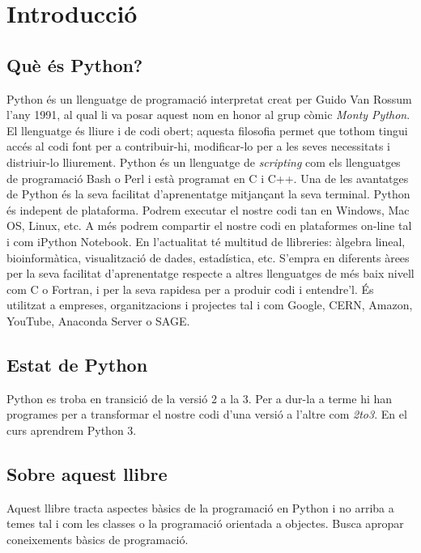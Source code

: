 


\chapter{Introducció}
\setcounter{page}{1}
\pagestyle{plain}   %


\section{Què és Python?}

Python és un llenguatge de programació interpretat creat per Guido Van Rossum l'any 1991, al qual li va posar aquest nom en honor al grup còmic \emph{Monty Python}. El llenguatge és lliure i de codi obert; aquesta filosofia permet que tothom tingui accés al codi font per a contribuir-hi, modificar-lo per a les seves necessitats i distriuir-lo lliurement. Python és un llenguatge de \emph{scripting} com els llenguatges de programació Bash o Perl i està programat en C i C++. Una de les avantatges de Python és la seva facilitat d'aprenentatge mitjançant la seva terminal. Python és indepent de plataforma. Podrem executar el nostre codi tan en Windows, Mac OS, Linux, etc. A més podrem compartir el nostre codi en plataformes on-line tal i com iPython Notebook. En l'actualitat té multitud de llibreries: àlgebra lineal, bioinformàtica, visualització de dades, estadística, etc. S'empra en diferents àrees per la seva facilitat d'aprenentatge respecte a altres llenguatges de més baix nivell com C o Fortran, i per la seva rapidesa per a produir codi i entendre'l. És utilitzat a empreses, organitzacions i projectes tal i com Google, CERN, Amazon, YouTube, Anaconda Server o SAGE. 
  

\section{Estat de Python}

Python es troba en transició de la versió 2 a la 3. Per a dur-la a terme hi han programes per a transformar el nostre codi d'una versió a l'altre com \emph{2to3}. En el curs aprendrem Python 3.


\section{Sobre aquest llibre}


Aquest llibre tracta aspectes bàsics de la programació en Python i no arriba a temes tal i com les classes o la programació orientada a objectes. Busca apropar coneixements bàsics de programació.

